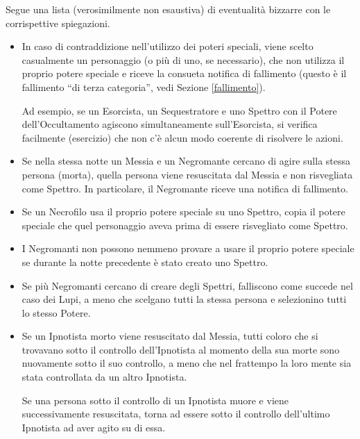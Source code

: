 \documentclass[a4paper,10pt]{article}
\begin{document}
Segue una lista (verosimilmente non esaustiva) di eventualità bizzarre con le corrispettive spiegazioni.

\begin{itemize}
 
 \item In caso di contraddizione nell'utilizzo dei poteri speciali, viene scelto casualmente un personaggio (o più di uno, se necessario), che non utilizza il proprio potere speciale e riceve la consueta notifica di fallimento (questo è il fallimento ``di terza categoria'', vedi Sezione \ref{fallimento}).
 
 Ad esempio, se un Esorcista, un Sequestratore e uno Spettro con il Potere dell'Occultamento agiscono simultaneamente sull'Esorcista, si verifica facilmente (esercizio) che non c'è alcun modo coerente di risolvere le azioni.
 
 \item Se nella stessa notte un Messia e un Negromante cercano di agire sulla stessa persona (morta), quella persona viene resuscitata dal Messia e non risvegliata come Spettro. In particolare, il Negromante riceve una notifica di fallimento.

 \item Se un Necrofilo usa il proprio potere speciale su uno Spettro, copia il potere speciale che quel personaggio aveva prima di essere risvegliato come Spettro.
 
 \item I Negromanti non possono nemmeno provare a usare il proprio potere speciale se durante la notte precedente è stato creato uno Spettro.
 
 \item Se più Negromanti cercano di creare degli Spettri, falliscono come succede nel caso dei Lupi, a meno che scelgano tutti la stessa persona e selezionino tutti lo stesso Potere.

 \item Se un Ipnotista morto viene resuscitato dal Messia, tutti coloro che si trovavano sotto il controllo dell'Ipnotista al momento della sua morte sono nuovamente sotto il suo controllo, a meno che nel frattempo la loro mente sia stata controllata da un altro Ipnotista.
 
 Se una persona sotto il controllo di un Ipnotista muore e viene successivamente resuscitata, torna ad essere sotto il controllo dell'ultimo Ipnotista ad aver agito su di essa.
 

\end{itemize}
\end{document}
